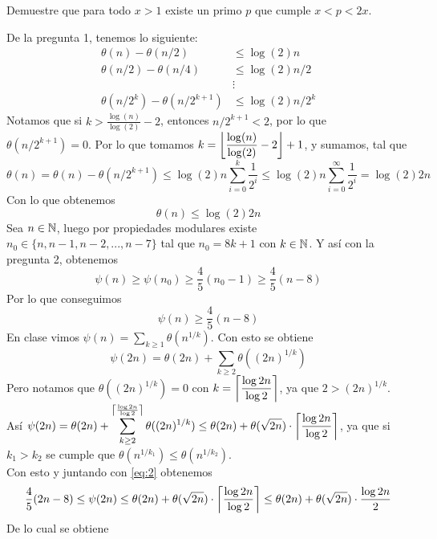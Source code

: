 \begin{prob}[5 pts.]
	Demuestre que para todo $x>1$ existe un primo $p$ que cumple $x<p<2x$.
\end{prob}

\begin{sol}
	De la pregunta 1, tenemos lo siguiente:
	\begin{align*}
		\theta(n)-\theta(n/2)           & \leq\log(2)n     \\
		\theta(n/2)-\theta(n/4)         & \leq\log(2)n/2   \\
		                                & \vdots           \\
		\theta(n/2^k)-\theta(n/2^{k+1}) & \leq\log(2)n/2^k
	\end{align*}
	Notamos que si $k>\frac{\log(n)}{\log(2)}-2$, entonces $n/2^{k+1}<2$, por lo que $\theta(n/2^{k+1})=0$. Por lo que tomamos $k=\left\lfloor\dfrac{\log(n)}{\log(2)}-2\right\rfloor+1$, y sumamos, tal que
	\[\theta(n)=\theta(n)-\theta(n/2^{k+1})\leq\log(2)n\sum_{i=0}^k\frac{1}{2^i}\leq\log(2)n\sum_{i=0}^\infty\frac{1}{2^i}=\log(2)2n\]
	Con lo que obtenemos
	\begin{equation}
		\theta(n)\leq\log(2)2n\label{eq:1}
	\end{equation}
	Sea $n\in\mathbb{N}$, luego por propiedades modulares existe $n_0\in\{n,n-1,n-2,...,n-7\}$ tal que $n_0=8k+1$ con $k\in\mathbb{N}$. Y así con la pregunta 2, obtenemos
	\[\psi(n)\geq\psi(n_0)\geq\frac{4}{5}(n_0-1)\geq\frac{4}{5}(n-8)\]
	Por lo que conseguimos
	\begin{equation}
		\psi(n)\geq\frac{4}{5}(n-8)\label{eq:2}
	\end{equation}
	En clase vimos $\psi(n)=\sum_{k\geq1}\theta(n^{1/k})$. Con esto se obtiene
	\[\psi(2n)=\theta(2n)+\sum_{k\geq2}\theta((2n)^{1/k})\]
	Pero notamos que $\theta((2n)^{1/k})=0$ con $k=\left\lceil\dfrac{\log2n}{\log2}\right\rceil$, ya que $2>(2n)^{1/k}$.\\
	Así $\displaystyle\psi(2n)=\theta(2n)+\sum_{k\geq2}^{\left\lceil\frac{\log2n}{\log2}\right\rceil}\theta((2n)^{1/k})\leq\theta(2n)+\theta(\sqrt{2n})\cdot\left\lceil\dfrac{\log2n}{\log2}\right\rceil$, ya que si $k_1>k_2$ se cumple que $\theta(n^{1/k_1})\leq\theta(n^{1/k_2})$.\\
	Con esto y juntando con \eqref{eq:2} obtenemos
	\begin{equation*}
		\frac{4}{5}(2n-8)\leq\psi(2n)\leq\theta(2n)+\theta(\sqrt{2n})\cdot\left\lceil\frac{\log2n}{\log2}\right\rceil\leq\theta(2n)+\theta(\sqrt{2n})\cdot\frac{\log2n}{2}
	\end{equation*}
	De lo cual se obtiene
	\begin{equation}

\end{equation}
\end{sol}
